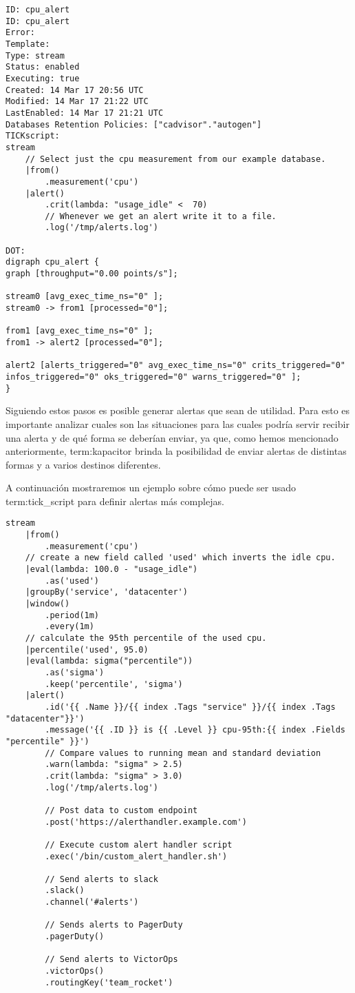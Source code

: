 \begin{lstlisting}
ID: cpu_alert
ID: cpu_alert
Error: 
Template: 
Type: stream
Status: enabled
Executing: true
Created: 14 Mar 17 20:56 UTC
Modified: 14 Mar 17 21:22 UTC
LastEnabled: 14 Mar 17 21:21 UTC
Databases Retention Policies: ["cadvisor"."autogen"]
TICKscript:
stream
    // Select just the cpu measurement from our example database.
    |from()
        .measurement('cpu')
    |alert()
        .crit(lambda: "usage_idle" <  70)
        // Whenever we get an alert write it to a file.
        .log('/tmp/alerts.log')

DOT:
digraph cpu_alert {
graph [throughput="0.00 points/s"];

stream0 [avg_exec_time_ns="0" ];
stream0 -> from1 [processed="0"];

from1 [avg_exec_time_ns="0" ];
from1 -> alert2 [processed="0"];

alert2 [alerts_triggered="0" avg_exec_time_ns="0" crits_triggered="0" infos_triggered="0" oks_triggered="0" warns_triggered="0" ];
}
\end{lstlisting}


Siguiendo estos pasos es posible generar alertas que sean de utilidad. Para
esto es importante analizar cuales son las situaciones para las cuales podría
servir recibir una alerta y de qué forma se deberían enviar, ya que, como hemos
mencionado anteriormente, \gls{term:kapacitor} brinda la posibilidad de enviar
alertas de distintas formas y a varios destinos diferentes.

A continuación mostraremos un ejemplo sobre cómo puede ser usado
\gls{term:tick_script} para definir alertas más complejas.

\begin{lstlisting}
stream
    |from()
        .measurement('cpu')
    // create a new field called 'used' which inverts the idle cpu.
    |eval(lambda: 100.0 - "usage_idle")
        .as('used')
    |groupBy('service', 'datacenter')
    |window()
        .period(1m)
        .every(1m)
    // calculate the 95th percentile of the used cpu.
    |percentile('used', 95.0)
    |eval(lambda: sigma("percentile"))
        .as('sigma')
        .keep('percentile', 'sigma')
    |alert()
        .id('{{ .Name }}/{{ index .Tags "service" }}/{{ index .Tags "datacenter"}}')
        .message('{{ .ID }} is {{ .Level }} cpu-95th:{{ index .Fields "percentile" }}')
        // Compare values to running mean and standard deviation
        .warn(lambda: "sigma" > 2.5)
        .crit(lambda: "sigma" > 3.0)
        .log('/tmp/alerts.log')

        // Post data to custom endpoint
        .post('https://alerthandler.example.com')

        // Execute custom alert handler script
        .exec('/bin/custom_alert_handler.sh')

        // Send alerts to slack
        .slack()
        .channel('#alerts')

        // Sends alerts to PagerDuty
        .pagerDuty()

        // Send alerts to VictorOps
        .victorOps()
        .routingKey('team_rocket')
\end{lstlisting}


